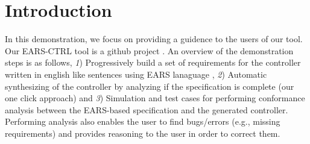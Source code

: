 \vspace{-1cm}
\section{Introduction}
\label{sec:intro}
\vspace{-.3cm}
In this demonstration, we focus on providing a guidence to the users of our
tool. Our \textsf{EARS-CTRL} tool is a github project \cite{EARSProject}.
An overview of the demonstration steps is as follows, \emph{1})
Progressively build a set of requirements for the controller written in english
like sentences using EARS lanaguage \cite{EARS}, \emph{2}) Automatic
synthesizing of the controller by analyzing if the specification is complete
(our one click approach) and \emph{3}) Simulation and test cases for performing
conformance analysis between the EARS-based specification and the generated controller. Performing analysis also enables the user to find bugs/errors (e.g., missing requirements) and provides reasoning to the user in order to correct them.